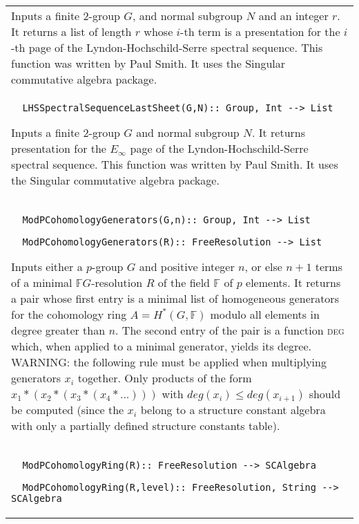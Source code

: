 \documentclass[a4paper,11pt]{report}
\begin{document}
{\begin{center}
\begin{tabular}{|l|}
 Inputs a finite $2$-group $G$, and normal subgroup $N$ and an integer $r$. It returns a list of length $r$ whose $i$-th term is a presentation for the $i$-th page of the Lyndon-Hochschild-Serre spectral sequence. This function was
written by Paul Smith. It uses the Singular commutative algebra package. \\
 \index{LHSSpectralSequenceLastSheet} 
\begin{verbatim}  LHSSpectralSequenceLastSheet(G,N):: Group, Int --> List
\end{verbatim}


 Inputs a finite $2$-group $G$ and normal subgroup $N$. It returns presentation for the $E_\infty$ page of the Lyndon-Hochschild-Serre spectral sequence. This function was
written by Paul Smith. It uses the Singular commutative algebra package. \\
 \index{ModPCohomologyGenerators} 
\begin{verbatim}  ModPCohomologyGenerators(G,n):: Group, Int --> List
\end{verbatim}
 
\begin{verbatim}  ModPCohomologyGenerators(R):: FreeResolution --> List
\end{verbatim}


 Inputs either a $p$-group $G$ and positive integer $n$, or else $n+1$ terms of a minimal $\mathbb FG$-resolution $R$ of the field $\mathbb F$ of $p$ elements. It returns a pair whose first entry is a minimal list of homogeneous
generators for the cohomology ring $A=H^\ast(G,\mathbb F)$ modulo all elements in degree greater than $n$. The second entry of the pair is a function \textsc{deg} which, when applied to a minimal generator, yields its degree. WARNING: the
following rule must be applied when multiplying generators $x_i$ together. Only products of the form $x_1*(x_2*(x_3*(x_4*...)))$ with $deg(x_i) \le deg(x_{i+1})$ should be computed (since the $x_i$ belong to a structure constant algebra with only a partially defined structure
constants table). \\
 \index{ModPCohomologyRing} 
\begin{verbatim}  ModPCohomologyRing(R):: FreeResolution --> SCAlgebra
\end{verbatim}
 
\begin{verbatim}  ModPCohomologyRing(R,level):: FreeResolution, String --> SCAlgebra
\end{verbatim}
 

\end{tabular}
\end{center}}
\end{document}
